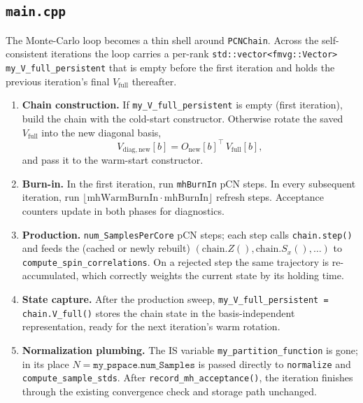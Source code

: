 \documentclass[11pt]{article}
\newcommand{\file}[1]{\texttt{#1}}
\newcommand{\code}[1]{\texttt{#1}}
\begin{document}
\subsection{\file{main.cpp}}\label{sec:warm-start}

The Monte-Carlo loop becomes a thin shell around \code{PCNChain}.  Across the
self-consistent iterations the loop carries a per-rank \code{std::vector<fmvg::Vector>
my\_V\_full\_persistent} that is empty before the first iteration and holds the
previous iteration's final $V_{\mathrm{full}}$ thereafter.

\begin{enumerate}
    \item \textbf{Chain construction.}  If \code{my\_V\_full\_persistent} is
          empty (first iteration), build the chain with the cold-start
          constructor.  Otherwise rotate the saved $V_{\mathrm{full}}$ into the
          new diagonal basis,
          \begin{equation}
              V_{\mathrm{diag, new}}[b] = O_{\mathrm{new}}[b]^{\top}\,
              V_{\mathrm{full}}[b],
          \end{equation}
          and pass it to the warm-start constructor.

    \item \textbf{Burn-in.}  In the first iteration, run \code{mhBurnIn} pCN
          steps.  In every subsequent iteration, run
          $\bigl\lfloor \text{mhWarmBurnIn} \cdot \text{mhBurnIn}\bigr\rfloor$
          refresh steps.  Acceptance counters update in both phases for
          diagnostics.

    \item \textbf{Production.}  \code{num\_SamplesPerCore} pCN steps; each step
          calls \code{chain.step()} and feeds the (cached or newly rebuilt)
          $(\text{chain}.Z(), \text{chain}.S_x(), \dots)$ to
          \code{compute\_spin\_correlations}.  On a rejected step the same
          trajectory is re-accumulated, which correctly weights the current
          state by its holding time.

    \item \textbf{State capture.}  After the production sweep,
          \code{my\_V\_full\_persistent = chain.V\_full()} stores the chain state
          in the basis-independent representation, ready for the next
          iteration's warm rotation.

    \item \textbf{Normalization plumbing.}  The IS variable
          \code{my\_partition\_function} is gone; in its place
          $N = \texttt{my\_pspace.num\_Samples}$ is passed directly to
          \code{normalize} and \code{compute\_sample\_stds}.  After
          \code{record\_mh\_acceptance()}, the iteration finishes through the
          existing convergence check and storage path unchanged.
\end{enumerate}
\end{document}
